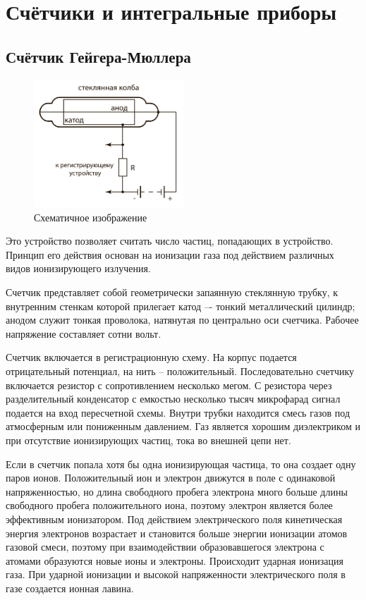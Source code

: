 \documentclass[14pt,pscyr,titlepage]{hedreport}
\begin{document}
    \pagebreak
	\section{Счётчики и интегральные приборы}
	\subsection{Счётчик Гейгера-Мюллера}
		\begin{figure}
			\vspace{-2ex}
			\includegraphics[width=0.5\textwidth]{geyger-myuller_counter}
			\parbox{0.5\textwidth}{\caption{Схематичное изображение}}
		\end{figure}
		Это устройство позволяет считать число частиц, попадающих в 
		устройство. Принцип его действия основан на ионизации газа под 
		действием различных видов ионизирующего излучения.

 		Счетчик представляет собой геометрически запаянную стеклянную трубку, 
 		к внутренним стенкам которой прилегает катод –- тонкий металлический 
 		цилиндр; анодом служит тонкая проволока, натянутая по центрально оси 
 		счетчика. Рабочее напряжение составляет сотни вольт. 

		Счетчик включается в регистрационную схему. На корпус подается 
		отрицательный потенциал, на нить -- положительный. Последовательно 
		счетчику включается резистор с сопротивлением  несколько мегом. С 
		резистора через разделительный конденсатор с емкостью несколько тысяч 
		микрофарад сигнал подается на вход пересчетной схемы. Внутри трубки 
		находится смесь газов под атмосферным или пониженным давлением. Газ 
		является хорошим диэлектриком и при отсутствие ионизирующих частиц, 
		тока во внешней цепи нет.  

		Если в счетчик попала хотя бы одна ионизирующая частица, то она 
		создает одну паров ионов. Положительный ион и электрон движутся в 
		поле с одинаковой напряженностью, но длина свободного пробега 
		электрона много больше длины свободного пробега положительного иона, 
		поэтому электрон является более эффективным ионизатором. Под действием 
		электрического поля  кинетическая энергия электронов возрастает и 
		становится больше энергии ионизации атомов газовой смеси, поэтому 
		при взаимодействии образовавшегося электрона с атомами  образуются 
		новые ионы и электроны. Происходит ударная ионизация газа. При ударной 
		ионизации и высокой напряженности электрического поля в газе создается 
		ионная лавина.        
\end{document}
